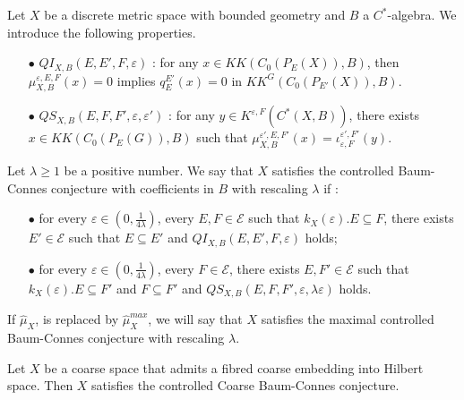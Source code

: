 \begin{itemize}
\begin{definition}
Let $X$ be a discrete metric space with bounded geometry and $B$ a $C^*$-algebra. We introduce the following properties.\\
\begin{itemize} 
\item[$\bullet$] $QI_{X,B}(E,E',F,\varepsilon)$ : for any $x\in KK(C_0(P_E(X)), B )$, then $\mu^{\varepsilon,E,F}_{X,B}(x) = 0$ implies $q_E^{E'}(x)=0$ in $KK^G(C_0(P_{E'}(X)),B)$.
\item[$\bullet$] $QS_{X,B}(E,F,F',\varepsilon,\varepsilon')$ : for any $y\in K^{\varepsilon,F}(C^*(X,B))$, there exists $x\in KK(C_0(P_E(G)),B)$ such that $\mu^{\varepsilon',E,F'}_{X,B}(x)=\iota_{\varepsilon,F}^{\varepsilon',F'}(y)$.\\
\end{itemize} 
Let $\lambda \geq 1$ be a positive number. We say that $X$ satisfies the controlled Baum-Connes conjecture with coefficients in $B$ with rescaling $\lambda$ if :
\begin{itemize} 
\item[$\bullet$] for every $\varepsilon \in (0,\frac{1}{4\lambda})$, every $E,F\in\mathcal E$ such that $k_X(\varepsilon).E\subseteq F$, there exists $E'\in \mathcal E$ such that $E \subseteq E'$ and $ QI_{X,B}(E,E',F,\varepsilon)$ holds; 
\item[$\bullet$] for every $\varepsilon \in (0,\frac{1}{4\lambda})$, every $F\in\mathcal E$, there exists $E,F'\in\mathcal E$ such that $k_X(\varepsilon).E \subseteq F'$ and $F\subseteq F'$ and $QS_{X,B}(E,F,F',\varepsilon,\lambda\varepsilon)$ holds. 
\end{itemize} 
If $\hat\mu_{X}$, is replaced by $\hat\mu^{max}_{X}$, we will say that $X$ satisfies the maximal controlled Baum-Connes conjecture with rescaling $\lambda$.\\
\end{definition}

\begin{cor}
Let $X$ be a coarse space that admits a fibred coarse embedding into Hilbert space. Then $X$ satisfies the controlled Coarse Baum-Connes conjecture.\\
\end{cor}



\end{itemize}
